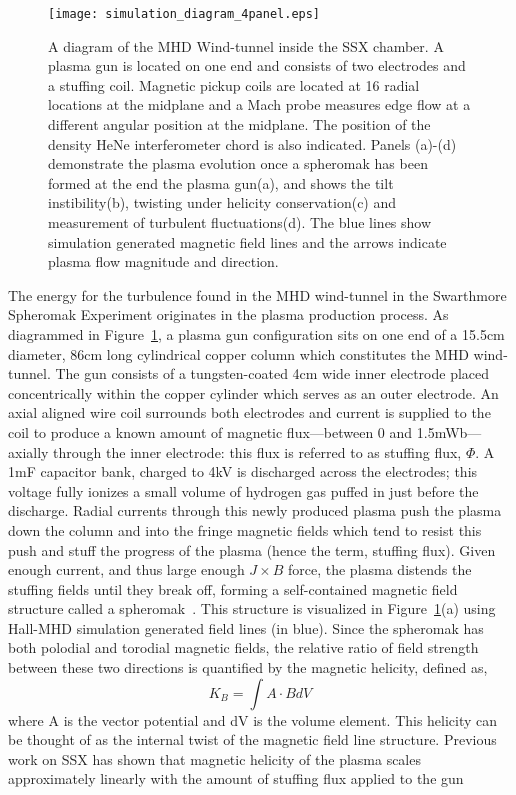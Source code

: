 \documentclass[aip,prl,amsmath,amssymb,reprint,superscriptaddress]{revtex4-1} %
\begin{document}
\begin{figure}[!htbp]
\centerline{
\texttt{[image: simulation\_diagram\_4panel.eps]}}
\caption{\label{fig:moviestills} A diagram of the MHD Wind-tunnel inside the SSX chamber. A plasma gun is located on one end and consists of two electrodes and a stuffing coil. Magnetic pickup coils are located at 16 radial locations at the midplane and a Mach probe measures edge flow at a different angular position at the midplane. The position of the density HeNe interferometer chord is also indicated. Panels (a)-(d) demonstrate the plasma evolution once a spheromak has been formed at the end the plasma gun(a), and shows the tilt instibility(b), twisting under helicity conservation(c) and measurement of turbulent fluctuations(d). The blue lines show simulation generated magnetic field lines and the arrows indicate plasma flow magnitude and direction.}
\end{figure}

The energy for the turbulence found in the MHD wind-tunnel in the Swarthmore Spheromak Experiment originates in the plasma production process. As diagrammed in Figure~\ref{fig:moviestills}, a plasma gun configuration sits on one end of a 15.5cm diameter, 86cm long cylindrical copper column which constitutes the MHD wind-tunnel. The gun consists of a tungsten-coated 4cm wide inner electrode placed concentrically within the copper cylinder which serves as an outer electrode. An axial aligned wire coil surrounds both electrodes and current is supplied to the coil to produce a known amount of magnetic flux---between 0 and 1.5mWb---axially through the inner electrode: this flux is referred to as stuffing flux, $\Phi$. A 1mF capacitor bank, charged to 4kV is discharged across the electrodes; this voltage fully ionizes a small volume of hydrogen gas puffed in just before the discharge. Radial currents through this newly produced plasma push the plasma down the column and into the fringe magnetic fields which tend to resist this push and stuff the progress of the plasma (hence the term, stuffing flux). Given enough current, and thus large enough $J\times B$ force, the plasma distends the stuffing fields until they break off, forming a self-contained magnetic field structure called a spheromak~\cite{barnes86,jarboe93}. This structure is visualized in Figure~\ref{fig:moviestills}(a) using Hall-MHD simulation generated field lines (in blue). Since the spheromak has both polodial and torodial magnetic fields, the relative ratio of field strength between these two directions is quantified by the magnetic helicity, defined as,
\begin{equation}
K_{B} = \int A \cdot B dV
\label{eq:helicity_th}
\end{equation}
where A is the vector potential and dV is the volume element. This helicity can be thought of as the internal twist of the magnetic field line structure. Previous work on SSX has shown that magnetic helicity of the plasma scales approximately linearly with the amount of stuffing flux applied to the gun~\cite{schaffner14b}
\end{document}
